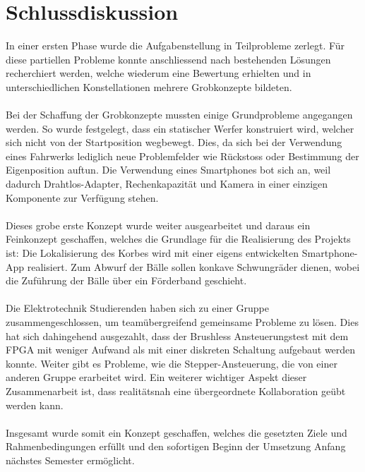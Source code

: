 \section{Schlussdiskussion}
In einer ersten Phase wurde die Aufgabenstellung in Teilprobleme zerlegt. Für diese partiellen 
Probleme konnte anschliessend nach bestehenden Lösungen recherchiert werden, welche wiederum 
eine Bewertung erhielten und in unterschiedlichen Konstellationen mehrere Grobkonzepte bildeten.\\
\\
Bei der Schaffung der Grobkonzepte mussten einige Grundprobleme angegangen werden. So wurde 
festgelegt, dass ein statischer Werfer konstruiert wird, welcher sich nicht von der Startposition 
wegbewegt. Dies, da sich bei der Verwendung eines Fahrwerks lediglich neue Problemfelder wie 
Rückstoss oder Bestimmung der Eigenposition auftun. Die Verwendung eines Smartphones bot sich 
an, weil dadurch Drahtlos-Adapter, Rechenkapazität und Kamera in einer einzigen Komponente zur Verfügung 
stehen. \\
\\
Dieses grobe erste Konzept wurde weiter ausgearbeitet und daraus ein Feinkonzept geschaffen, 
welches die Grundlage für die Realisierung des Projekts ist: Die Lokalisierung des Korbes wird 
mit einer eigens entwickelten Smartphone-App realisiert. Zum Abwurf der Bälle sollen konkave 
Schwungräder dienen, wobei die Zuführung der Bälle über ein Förderband 
geschieht. \\
\\
Die Elektrotechnik Studierenden haben sich zu einer Gruppe zusammengeschlossen, um 
teamübergreifend gemeinsame Probleme zu lösen. Dies hat sich dahingehend ausgezahlt, dass 
der Brushless Ansteuerungstest mit dem FPGA mit weniger Aufwand als mit einer diskreten Schaltung 
aufgebaut werden konnte. Weiter gibt es Probleme, wie die Stepper-Ansteuerung, die von einer anderen 
Gruppe erarbeitet wird. Ein weiterer wichtiger 
Aspekt dieser Zusammenarbeit ist, dass realitätsnah eine übergeordnete Kollaboration geübt werden 
kann.\\
\\
Insgesamt wurde somit ein Konzept geschaffen, welches die gesetzten Ziele und 
Rahmenbedingungen erfüllt und den sofortigen Beginn der Umsetzung Anfang nächstes Semester 
ermöglicht.